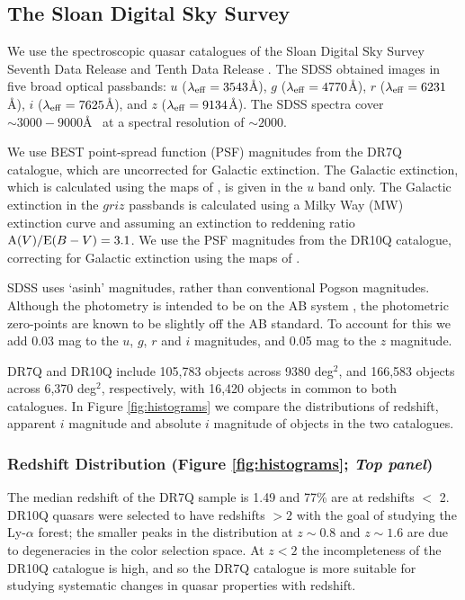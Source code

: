 \subsection{The Sloan Digital Sky Survey}

We use the spectroscopic quasar catalogues of the Sloan Digital Sky Survey \citep[SDSS;][]{york00} Seventh Data Release \citep[DR7Q;][]{schneider10} and Tenth Data Release \citep[DR10Q;][]{paris14}. The SDSS obtained images in five broad optical passbands: $u$ ($\lambda_{\rm eff} = 3543$\AA), $g$ ($\lambda_{\rm eff} = 4770$\AA), $r$ ($\lambda_{\rm eff} = 6231$\AA), $i$ ($\lambda_{\rm eff} = 7625$\AA), and $z$ ($\lambda_{\rm eff} = 9134$\AA). The SDSS spectra cover $\sim 3000 - 9000$\AA~ at a spectral resolution of $\sim 2000$. 

We use BEST point-spread function (PSF) magnitudes from the DR7Q catalogue, which are uncorrected for Galactic extinction. The Galactic extinction, which is calculated using the maps of \citet{schlegel98}, is given in the $u$ band only. The Galactic extinction in the $griz$ passbands is calculated using a Milky Way (MW) extinction curve \citep{pei92} and assuming an extinction to reddening ratio ${\rm A}(V) / {\rm E}(B-V) = 3.1$. We use the PSF magnitudes from the DR10Q catalogue, correcting for Galactic extinction using the maps of \citet{schlafly11}. 

SDSS uses `asinh' magnitudes, rather than conventional Pogson magnitudes. Although the photometry is intended to be on the AB system \citet{oke83}, the photometric zero-points are known to be slightly off the AB standard. To account for this we add 0.03 mag to the $u$, $g$, $r$ and $i$ magnitudes, and 0.05 mag to the $z$ magnitude. 

DR7Q and DR10Q include 105,783 objects across 9380 deg$^2$, and 166,583 objects across 6,370 deg$^2$, respectively, with 16,420 objects in common to both catalogues. In Figure \ref{fig:histograms} we compare the distributions of redshift, apparent $i$ magnitude and absolute $i$ magnitude of objects in the two catalogues. 

\subsubsection{Redshift Distribution (Figure \ref{fig:histograms}; {\it Top panel})}

The median redshift of the DR7Q sample is 1.49 and 77\% are at redshifts $<$ 2. DR10Q quasars were selected to have redshifts $>2$ with the goal of studying the Ly-$\alpha$ forest; the smaller peaks in the distribution at $z \sim 0.8$ and $z \sim 1.6$ are due to degeneracies in the color selection space. At $z<2$ the incompleteness of the DR10Q catalogue is high, and so the DR7Q catalogue is more suitable for studying systematic changes in quasar properties with redshift. 

